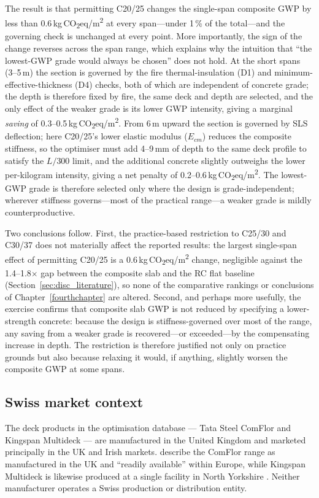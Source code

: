 The result is that permitting C20/25 changes the single-span composite GWP by less than 0.6\,kg\,CO\textsubscript{2}eq/m\textsuperscript{2} at every span---under 1\,\% of the total---and the governing check is unchanged at every point. More importantly, the sign of the change reverses across the span range, which explains why the intuition that ``the lowest-GWP grade would always be chosen'' does not hold. At the short spans (3--5\,m) the section is governed by the fire thermal-insulation (D1) and minimum-effective-thickness (D4) checks, both of which are independent of concrete grade; the depth is therefore fixed by fire, the same deck and depth are selected, and the only effect of the weaker grade is its lower GWP intensity, giving a marginal \emph{saving} of 0.3--0.5\,kg\,CO\textsubscript{2}eq/m\textsuperscript{2}. From 6\,m upward the section is governed by SLS deflection; here C20/25's lower elastic modulus ($E_{cm}$) reduces the composite stiffness, so the optimiser must add 4--9\,mm of depth to the same deck profile to satisfy the $L/300$ limit, and the additional concrete slightly outweighs the lower per-kilogram intensity, giving a net penalty of 0.2--0.6\,kg\,CO\textsubscript{2}eq/m\textsuperscript{2}. The lowest-GWP grade is therefore selected only where the design is grade-independent; wherever stiffness governs---most of the practical range---a weaker grade is mildly counterproductive.
 
Two conclusions follow. First, the practice-based restriction to C25/30 and C30/37 does not materially affect the reported results: the largest single-span effect of permitting C20/25 is a 0.6\,kg\,CO\textsubscript{2}eq/m\textsuperscript{2} change, negligible against the 1.4--1.8$\times$ gap between the composite slab and the RC flat baseline (Section~\ref{sec:disc_literature}), so none of the comparative rankings or conclusions of Chapter~\ref{fourthchapter} are altered. Second, and perhaps more usefully, the exercise confirms that composite slab GWP is not reduced by specifying a lower-strength concrete: because the design is stiffness-governed over most of the range, any saving from a weaker grade is recovered---or exceeded---by the compensating increase in depth. The restriction is therefore justified not only on practice grounds but also because relaxing it would, if anything, slightly worsen the composite GWP at some spans.

\subsection{Swiss market context}
\label{sec:disc_swiss}
The deck products in the optimisation database --- Tata Steel ComFlor and Kingspan Multideck --- are manufactured in the United Kingdom and marketed principally in the UK and Irish markets. \cite{RefWorks:2017comflor} describe the ComFlor range as manufactured in the UK and \enquote{readily available} within Europe, while Kingspan Multideck is likewise produced at a single facility in North Yorkshire \citep{RefWorks:kingspan2026multideck}. Neither manufacturer operates a Swiss production or distribution entity.

